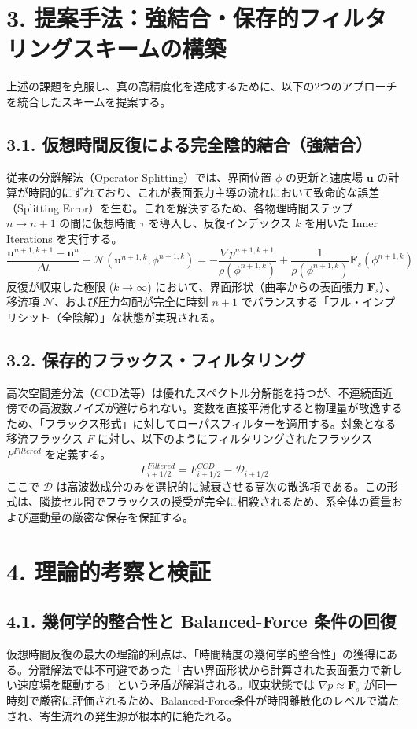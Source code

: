 \documentclass[12pt, a4paper, titlepage]{article}
\begin{document}
\section*{3. 提案手法：強結合・保存的フィルタリングスキームの構築}
上述の課題を克服し、真の高精度化を達成するために、以下の2つのアプローチを統合したスキームを提案する。

\subsection*{3.1. 仮想時間反復による完全陰的結合（強結合）}
従来の分離解法（Operator Splitting）では、界面位置 $\phi$ の更新と速度場 $\mathbf{u}$ の計算が時間的にずれており、これが表面張力主導の流れにおいて致命的な誤差（Splitting Error）を生む。これを解決するため、各物理時間ステップ $n \to n+1$ の間に仮想時間 $\tau$ を導入し、反復インデックス $k$ を用いた Inner Iterations を実行する。
$$\frac{\mathbf{u}^{n+1, k+1} - \mathbf{u}^n}{\Delta t} + \mathcal{N}(\mathbf{u}^{n+1, k}, \phi^{n+1, k}) = -\frac{\nabla p^{n+1, k+1}}{\rho(\phi^{n+1, k})} + \frac{1}{\rho(\phi^{n+1, k})} \mathbf{F}_s(\phi^{n+1, k})$$反復が収束した極限 ($k \to \infty$) において、界面形状（曲率からの表面張力 $\mathbf{F}_s$）、移流項 $\mathcal{N}$、および圧力勾配が完全に時刻 $n+1$ でバランスする「フル・インプリシット（全陰解）」な状態が実現される。

\subsection*{3.2. 保存的フラックス・フィルタリング}
高次空間差分法（CCD法等）は優れたスペクトル分解能を持つが、不連続面近傍での高波数ノイズが避けられない。変数を直接平滑化すると物理量が散逸するため、「フラックス形式」に対してローパスフィルターを適用する。対象となる移流フラックス $F$ に対し、以下のようにフィルタリングされたフラックス $F^{Filtered}$ を定義する。$$F_{i+1/2}^{Filtered} = F_{i+1/2}^{CCD} - \mathcal{D}_{i+1/2}$$
ここで $\mathcal{D}$ は高波数成分のみを選択的に減衰させる高次の散逸項である。この形式は、隣接セル間でフラックスの授受が完全に相殺されるため、系全体の質量および運動量の厳密な保存を保証する。

\section*{4. 理論的考察と検証}
\subsection*{4.1. 幾何学的整合性と Balanced-Force 条件の回復}
仮想時間反復の最大の理論的利点は、「時間精度の幾何学的整合性」の獲得にある。分離解法では不可避であった「古い界面形状から計算された表面張力で新しい速度場を駆動する」という矛盾が解消される。収束状態では $\nabla p \approx \mathbf{F}_s$ が同一時刻で厳密に評価されるため、Balanced-Force条件が時間離散化のレベルで満たされ、寄生流れの発生源が根本的に絶たれる。
\end{document}

